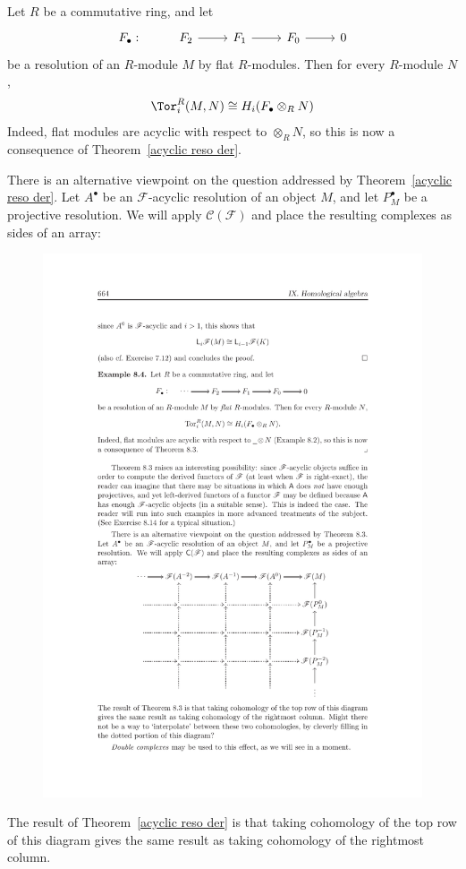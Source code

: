 \begin{example}
Let $R$ be a commutative ring, and let
\[\begin{tikzcd}
F_\bullet:&F_2\ar[r]&F_1\ar[r]&F_0\ar[r]&0
\end{tikzcd}\]
be a resolution of an $R$-module $M$ by flat $R$-modules. Then for every $R$-module $N$,
\[\Tor_i^R(M,N)\cong H_i(F_\bullet\otimes_{R}N)\]
Indeed, flat modules are acyclic with respect to $\otimes_{R}N$, so this is now a consequence of Theorem~\ref{acyclic reso der}.
\end{example}
There is an alternative viewpoint on the question addressed by Theorem~\ref{acyclic reso der}. Let $A^\bullet$ be an $\mathscr{F}$-acyclic resolution of an object $M$, and let $P^\bullet_M$ be a projective resolution. We will apply $\mathcal{C}(\mathscr{F})$ and place the resulting complexes as sides of an array:
\begin{figure}[!h]
\centering
\includegraphics{pictures/doublecomp.pdf}
\end{figure}
The result of Theorem~\ref{acyclic reso der} is that taking cohomology of the top row of this diagram gives the same result as taking cohomology of the rightmost column.
